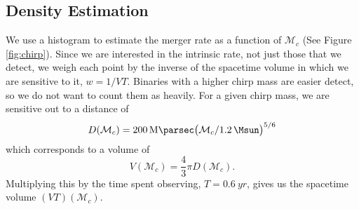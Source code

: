 \subsection{Density Estimation}

We use a histogram to estimate the merger rate as a function of $\mathcal{M}_c$ (See Figure \ref{fig:chirp}). Since we are interested in the intrinsic rate, not just those that we detect, we weigh each point by the inverse of the spacetime volume in which we are sensitive to it, $w = 1 / VT$. Binaries with a higher chirp mass are easier detect, so we do not want to count them as heavily. For a given chirp mass, we are sensitive out to a distance of
%
\begin{equation}
  D(\mathcal{M}_c) =
  \SI{200}{\mega\parsec} \qty( \mathcal{M}_c / \SI{1.2}{\Msun} )^{5/6}
\end{equation}
%
which corresponds to a volume of
%
\begin{equation}
  V(\mathcal{M}_c) = \frac{4}{3} \pi D(\mathcal{M}_c).
\end{equation}
%
Multiplying this by the time spent observing, $T = \SI{0.6}{yr}$, gives us the spacetime volume $(VT)(\mathcal{M}_c)$.
